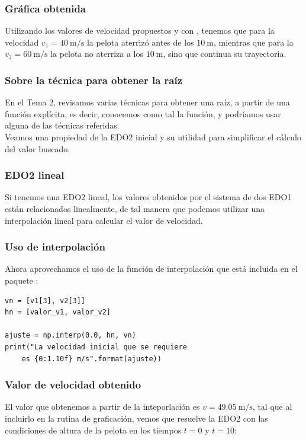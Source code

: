 \begin{frame}
\frametitle{Gráfica obtenida}
Utilizando los valores de velocidad propuestos y con , tenemos que para la velocidad $v_{1} = \SI{40}{\meter\per\second}$ la pelota aterrizó antes de los $\SI{10}{\meter}$, mientras que para la $v_{2} = \SI{60}{\meter\per\second}$ la pelota no aterriza a los $\SI{10}{\meter}$, sino que continua su trayectoria.
\end{frame}
\begin{frame}
\frametitle{Sobre la técnica para obtener la raíz}
En el Tema 2, revisamos varias técnicas para obtener una raíz, a partir de una función explícita, es decir, conocemos como tal la función, y podríamos usar alguna de las técnicas referidas.
\\
\bigskip
Veamos una propiedad de la EDO2 inicial y su utilidad para simplificar el cálculo del valor buscado.
\end{frame}
\begin{frame}
\frametitle{EDO2 lineal}
Si tenemos una EDO2 lineal, los valores obtenidos por el sistema de dos EDO1 están relacionados linealmente, de tal manera que podemos utilizar una interpolación lineal para calcular el valor de velocidad.
\end{frame}
\begin{frame}[fragile]
\frametitle{Uso de interpolación}
Ahora aprovechamos el uso de la función de interpolación que está incluida en el paquete :
\begin{verbatim}
vn = [v1[3], v2[3]]
hn = [valor_v1, valor_v2]

ajuste = np.interp(0.0, hn, vn)
print("La velocidad inicial que se requiere 
    es {0:1.10f} m/s".format(ajuste))
\end{verbatim}
\end{frame}
\begin{frame}
\frametitle{Valor de velocidad obtenido}
El valor que obtenemos a partir de la inteporlación es $v = \SI{49.05}{\meter\per\second}$, tal que al incluirlo en la rutina de graficación, vemos que resuelve la EDO2 con las condiciones de altura de la pelota en los tiempos $t = 0$ y $t = 10$:
\end{frame}
